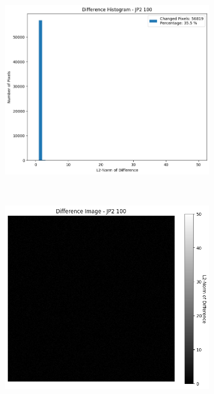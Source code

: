 \begin{figure}[htb]
\begin{subfigure}[b]{0.48\textwidth}
        \includegraphics[width=\textwidth]{doc/thesis/0_figures/compare_quality/set1/jp2_100_center_diff_histogram.png}
        \caption{}
        \label{fig:img_quality_comp_jp2_100_center_histo}
    \end{subfigure}
    \\
    \begin{subfigure}[b]{0.48\textwidth}
        \centering
        \includegraphics[width=\textwidth]{doc/thesis/0_figures/compare_quality/set1/jp2_100_center_diff_heatmap.png}

\end{subfigure}
\end{figure}
